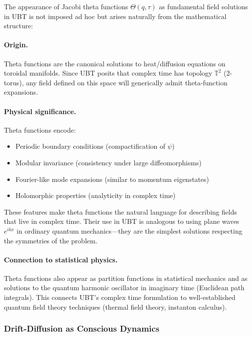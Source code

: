 The appearance of Jacobi theta functions $\Theta(q,\tau)$ as fundamental field solutions in UBT is not imposed ad hoc but arises naturally from the mathematical structure:

\paragraph{Origin.} Theta functions are the canonical solutions to heat/diffusion equations on toroidal manifolds. Since UBT posits that complex time has topology $\mathbb{T}^2$ (2-torus), any field defined on this space will generically admit theta-function expansions.

\paragraph{Physical significance.} Theta functions encode:
\begin{itemize}
\item Periodic boundary conditions (compactification of $\psi$)
\item Modular invariance (consistency under large diffeomorphisms)
\item Fourier-like mode expansions (similar to momentum eigenstates)
\item Holomorphic properties (analyticity in complex time)
\end{itemize}

These features make theta functions the natural language for describing fields that live in complex time. Their use in UBT is analogous to using plane waves $e^{ikx}$ in ordinary quantum mechanics—they are the simplest solutions respecting the symmetries of the problem.

\paragraph{Connection to statistical physics.} Theta functions also appear as partition functions in statistical mechanics and as solutions to the quantum harmonic oscillator in imaginary time (Euclidean path integrals). This connects UBT's complex time formulation to well-established quantum field theory techniques (thermal field theory, instanton calculus).

\subsubsection{Drift-Diffusion as Conscious Dynamics}

